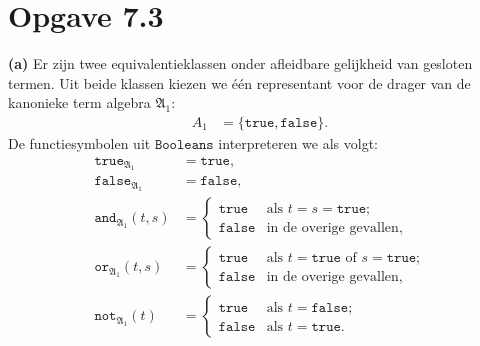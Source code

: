\documentclass[a4paper,11pt]{article}
\begin{document}
\section*{Opgave 7.3}

\begin{description}

\item{\bf (a)} %
Er zijn twee equivalentieklassen onder afleidbare gelijkheid van gesloten
termen. Uit beide klassen kiezen we \'e\'en representant voor de drager van de
kanonieke term algebra $\mathfrak{A}_{1}$:
\begin{align*}
A_{1} &= \{\texttt{true}, \texttt{false}\}.
\end{align*}
De functiesymbolen uit $\texttt{Booleans}$ interpreteren we als volgt:
\begin{align*}
\texttt{true}_{\mathfrak{A}_{1}}     &= \texttt{true}, \\
\texttt{false}_{\mathfrak{A}_{1}}    &= \texttt{false}, \\
\texttt{and}_{\mathfrak{A}_{1}}(t,s) &= \begin{cases}
  \texttt{true}  & \text{als $t = s = \texttt{true}$;} \\
  \texttt{false} & \text{in de overige gevallen},
\end{cases} \\
\texttt{or}_{\mathfrak{A}_{1}}(t,s) &= \begin{cases}
  \texttt{true}  & \text{als $t = \texttt{true}$ of $s = \texttt{true}$;} \\
  \texttt{false} & \text{in de overige gevallen,}
\end{cases} \\
\texttt{not}_{\mathfrak{A}_{1}}(t) &= \begin{cases}
  \texttt{true}  & \text{als $t = \texttt{false}$;} \\
  \texttt{false} & \text{als $t = \texttt{true}$.}
\end{cases}
\end{align*}


\end{description}
\end{document}
